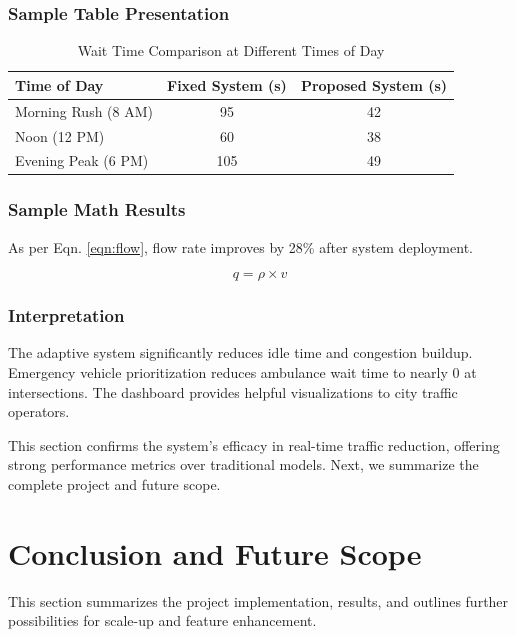 \documentclass[12pt]{report}
\begin{document}
\subsection{Sample Table Presentation}
\begin{table}[htb]
\fontsize{10}{12}\selectfont
\caption{Wait Time Comparison at Different Times of Day}
\label{res:tab1}
\begin{tabular}{|p{4cm}|c|c|}
\hline
\textbf{Time of Day} & \textbf{Fixed System (s)} & \textbf{Proposed System (s)} \\\hline
Morning Rush (8 AM) & 95 & 42 \\\hline
Noon (12 PM) & 60 & 38 \\\hline
Evening Peak (6 PM) & 105 & 49 \\\hline
\end{tabular}
\end{table}

\subsection{Sample Math Results}
As per Eqn. \ref{eqn:flow}, flow rate improves by 28\% after system deployment.

\begin{equation}
q = \rho \times v
\label{eqn:flow}
\end{equation}

\subsection{Interpretation}
The adaptive system significantly reduces idle time and congestion buildup. Emergency vehicle prioritization reduces ambulance wait time to nearly 0 at intersections. The dashboard provides helpful visualizations to city traffic operators.

\vspace{0.5cm}

This section confirms the system’s efficacy in real-time traffic reduction, offering strong performance metrics over traditional models. Next, we summarize the complete project and future scope.

\chapter{Conclusion and Future Scope}

This section summarizes the project implementation, results, and outlines further possibilities for scale-up and feature enhancement.
\end{document}
